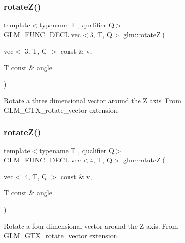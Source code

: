 \subsubsection{\texorpdfstring{rotate\+Z()}{rotateZ()}\hspace{0.1cm}{\footnotesize\ttfamily [1/2]}}
{\footnotesize\ttfamily template$<$typename T , qualifier Q$>$ \\
\hyperlink{setup_8hpp_ab2d052de21a70539923e9bcbf6e83a51}{G\+L\+M\+\_\+\+F\+U\+N\+C\+\_\+\+D\+E\+CL} \hyperlink{structglm_1_1vec}{vec}$<$3, T, Q$>$ glm\+::rotateZ (\begin{DoxyParamCaption}\item[{\hyperlink{structglm_1_1vec}{vec}$<$ 3, T, Q $>$ const \&}]{v,  }\item[{T const \&}]{angle }\end{DoxyParamCaption})}

Rotate a three dimensional vector around the Z axis. From G\+L\+M\+\_\+\+G\+T\+X\+\_\+rotate\+\_\+vector extension. \mbox{\label{group__gtx__rotate__vector_ga923b75c6448161053768822d880702e6}} 
\subsubsection{\texorpdfstring{rotate\+Z()}{rotateZ()}\hspace{0.1cm}{\footnotesize\ttfamily [2/2]}}
{\footnotesize\ttfamily template$<$typename T , qualifier Q$>$ \\
\hyperlink{setup_8hpp_ab2d052de21a70539923e9bcbf6e83a51}{G\+L\+M\+\_\+\+F\+U\+N\+C\+\_\+\+D\+E\+CL} \hyperlink{structglm_1_1vec}{vec}$<$4, T, Q$>$ glm\+::rotateZ (\begin{DoxyParamCaption}\item[{\hyperlink{structglm_1_1vec}{vec}$<$ 4, T, Q $>$ const \&}]{v,  }\item[{T const \&}]{angle }\end{DoxyParamCaption})}

Rotate a four dimensional vector around the Z axis. From G\+L\+M\+\_\+\+G\+T\+X\+\_\+rotate\+\_\+vector extension. \mbox{\label{group__gtx__rotate__vector_ga8b11b18ce824174ea1a5a69ea14e2cee}} 
